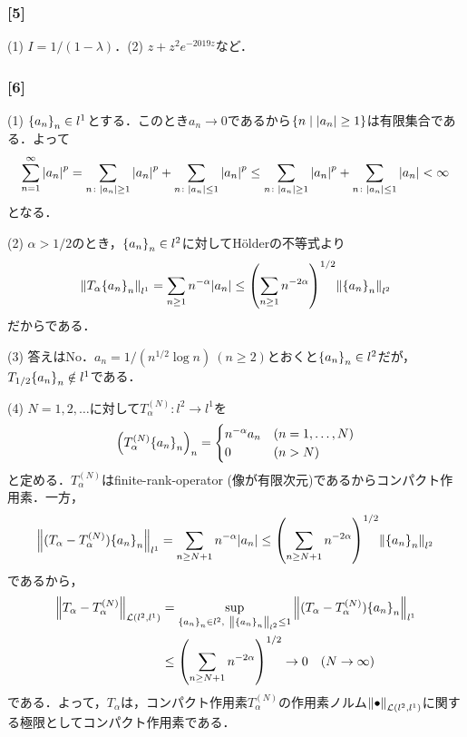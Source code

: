 \documentclass[a4j]{ltjsarticle}
\newcommand{\1}{\mathbbm{1}}
\numberwithin{equation}{section}
\theoremstyle{definition}
\begin{document}
\subsubsection*{[5]}
(1) $I=1/(1-\lambda)$．(2) $z+z^2e^{-2019z}$など．

\subsubsection*{[6]}
(1) $\qty{a_n}_n\in l^1$とする．このとき$a_n\to0$であるから$\qty{n\mid \abs{a_n}\geq 1}$は有限集合である．よって
\begin{equation}
    \sum_{n=1}^\infty \abs{a_n}^p=\sum_{n\colon \abs{a_n}\geq 1}\abs{a_n}^p+\sum_{n\colon \abs{a_n}\leq 1}\abs{a_n}^p \leq \sum_{n\colon \abs{a_n}\geq 1}\abs{a_n}^p+\sum_{n\colon \abs{a_n}\leq 1}\abs{a_n}<\infty 
\end{equation}
となる．

(2) $\alpha>1/2$のとき，$\qty{a_n}_n\in l^2$に対してHölderの不等式より 
\begin{equation}
    \norm{T_\alpha \qty{a_n}_n}_{l^1}=\sum_{n\geq1} n^{-\alpha}\abs{a_n}\leq \qty(\sum_{n\geq 1}n^{-2\alpha})^{1/2}\norm{\qty{a_n}_n}_{l^2}
\end{equation}
だからである．

(3) 答えはNo．$a_n=1/(n^{1/2}\log n)\ (n\geq 2)$とおくと$\qty{a_n}_n\in l^2$だが，$T_{1/2}\qty{a_n}_n\notin l^1$である．

(4) $N=1,2,\ldots$に対して$T^{(N)}_{\alpha}\colon l^2\to l^1$を
\begin{equation}
    \qty(T^{(N)}_{\alpha}\qty{a_n}_n)_n=\begin{cases}
        n^{-\alpha}a_n & (n=1,\ldots,N) \\
        0 & (n>N)
    \end{cases}
\end{equation}
と定める．$T^{(N)}_{\alpha}$はfinite-rank-operator (像が有限次元)であるからコンパクト作用素．一方，
\begin{equation}
    \norm{(T_{\alpha}-T^{(N)}_{\alpha})\qty{a_n}_n}_{l^1}=\sum_{n\geq N+1}n^{-\alpha}\abs{a_n}\leq \qty(\sum_{n\geq N+1}n^{-2\alpha})^{1/2}\norm{\qty{a_n}_{n}}_{l^2}
\end{equation}
であるから，
\begin{align}
    \norm{T_{\alpha}-T^{(N)}_{\alpha}}_{\mathcal{L}(l^2,l^1)}
    &=\sup_{\qty{a_n}_n\in l^2,\ \norm{\qty{a_n}_{n}}_{l^2}
    \leq 1}\norm{(T_{\alpha}-T^{(N)}_{\alpha})\qty{a_n}_n}_{l^1}\\
    &\leq \qty(\sum_{n\geq N+1}n^{-2\alpha})^{1/2}\to0\quad (N\to\infty)
\end{align}
である．よって，$T_\alpha$は，コンパクト作用素$T_{\alpha}^{(N)}$の作用素ノルム$\norm{\bullet}_{\mathcal{L}(l^2,l^1)}$に関する極限としてコンパクト作用素である．
\end{document}
